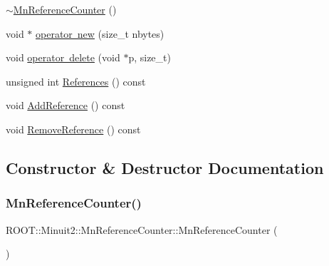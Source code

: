 \begin{DoxyCompactItemize}
\item 
\mbox{\hyperlink{classROOT_1_1Minuit2_1_1MnReferenceCounter_ab78e13c79097fd8f5983dada7fab2f3d}{$\sim$\+Mn\+Reference\+Counter}} ()
\item 
void $\ast$ \mbox{\hyperlink{classROOT_1_1Minuit2_1_1MnReferenceCounter_af7e9fdee3f67cac68328bbd05f6f2958}{operator new}} (size\+\_\+t nbytes)
\item 
void \mbox{\hyperlink{classROOT_1_1Minuit2_1_1MnReferenceCounter_a792b5f277bb7df7c032c603eed5ae6f9}{operator delete}} (void $\ast$p, size\+\_\+t)
\item 
unsigned int \mbox{\hyperlink{classROOT_1_1Minuit2_1_1MnReferenceCounter_a8c4e8a4427e3f5eeaad4001a364f8a5a}{References}} () const
\item 
void \mbox{\hyperlink{classROOT_1_1Minuit2_1_1MnReferenceCounter_afab040d933d93fd7f86b3c14a8d1910d}{Add\+Reference}} () const
\item 
void \mbox{\hyperlink{classROOT_1_1Minuit2_1_1MnReferenceCounter_a243db2ef8fc1fab0a29ea1c83aececab}{Remove\+Reference}} () const
\end{DoxyCompactItemize}


\subsection{Constructor \& Destructor Documentation}
\mbox{\label{classROOT_1_1Minuit2_1_1MnReferenceCounter_a9d841e3e0752316d6f4988b995d834b8}} 
\subsubsection{\texorpdfstring{MnReferenceCounter()}{MnReferenceCounter()}\hspace{0.1cm}{\footnotesize\ttfamily [1/6]}}
{\footnotesize\ttfamily R\+O\+O\+T\+::\+Minuit2\+::\+Mn\+Reference\+Counter\+::\+Mn\+Reference\+Counter (\begin{DoxyParamCaption}{ }\end{DoxyParamCaption})\hspace{0.3cm}{\ttfamily [inline]}}

\mbox{\label{classROOT_1_1Minuit2_1_1MnReferenceCounter_ac12866f9e41be0b9f943326772eee89a}} 
